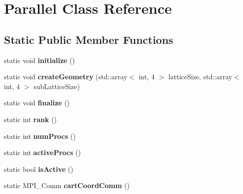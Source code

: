 \hypertarget{classParallel}{}\section{Parallel Class Reference}
\label{classParallel}
\subsection*{Static Public Member Functions}
\begin{DoxyCompactItemize}
\item 
static void {\bfseries initialize} ()\hypertarget{classParallel_a7cf27d593972dee2d3f6e5319fcf450e}{}\label{classParallel_a7cf27d593972dee2d3f6e5319fcf450e}

\item 
static void {\bfseries create\+Geometry} (std\+::array$<$ int, 4 $>$ lattice\+Size, std\+::array$<$ int, 4 $>$ sub\+Lattice\+Size)\hypertarget{classParallel_a8888fe404de3a3f479fff0796916f851}{}\label{classParallel_a8888fe404de3a3f479fff0796916f851}

\item 
static void {\bfseries finalize} ()\hypertarget{classParallel_ac81d8fad81830939d9338b2e46d71b60}{}\label{classParallel_ac81d8fad81830939d9338b2e46d71b60}

\item 
static int {\bfseries rank} ()\hypertarget{classParallel_ad8a436ba61d28a6f7569eec3ac4a929e}{}\label{classParallel_ad8a436ba61d28a6f7569eec3ac4a929e}

\item 
static int {\bfseries num\+Procs} ()\hypertarget{classParallel_a6af0b709a019dd91b0d3bbd4a2b74e54}{}\label{classParallel_a6af0b709a019dd91b0d3bbd4a2b74e54}

\item 
static int {\bfseries active\+Procs} ()\hypertarget{classParallel_a9569b920d302407a51a43c125a878b43}{}\label{classParallel_a9569b920d302407a51a43c125a878b43}

\item 
static bool {\bfseries is\+Active} ()\hypertarget{classParallel_a1402031c4027212fa9cd53cbe86b5b41}{}\label{classParallel_a1402031c4027212fa9cd53cbe86b5b41}

\item 
static M\+P\+I\+\_\+\+Comm {\bfseries cart\+Coord\+Comm} ()\hypertarget{classParallel_a127b363a07b22186627f532b2ab04c28}{}\label{classParallel_a127b363a07b22186627f532b2ab04c28}


\end{DoxyCompactItemize}
